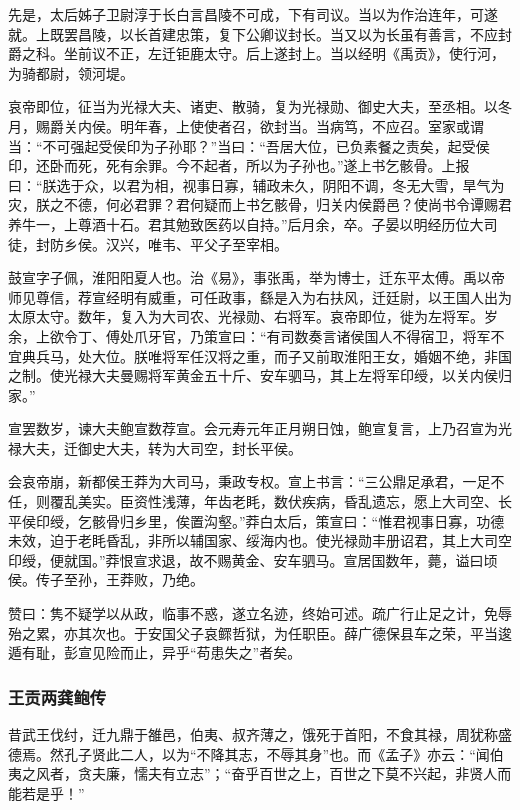 \documentclass[]{article}
\begin{document}
先是，太后姊子卫尉淳于长白言昌陵不可成，下有司议。当以为作治连年，可遂就。上既罢昌陵，以长首建忠策，复下公卿议封长。当又以为长虽有善言，不应封爵之科。坐前议不正，左迁钜鹿太守。后上遂封上。当以经明《禹贡》，使行河，为骑都尉，领河堤。

哀帝即位，征当为光禄大夫、诸吏、散骑，复为光禄勋、御史大夫，至丞相。以冬月，赐爵关内侯。明年春，上使使者召，欲封当。当病笃，不应召。室家或谓当：``不可强起受侯印为子孙耶？''当曰：``吾居大位，已负素餐之责矣，起受侯印，还卧而死，死有余罪。今不起者，所以为子孙也。''遂上书乞骸骨。上报曰：``朕选于众，以君为相，视事日寡，辅政未久，阴阳不调，冬无大雪，旱气为灾，朕之不德，何必君罪？君何疑而上书乞骸骨，归关内侯爵邑？使尚书令谭赐君养牛一，上尊酒十石。君其勉致医药以自持。''后月余，卒。子晏以明经历位大司徒，封防乡侯。汉兴，唯韦、平父子至宰相。

鼓宣字子佩，淮阳阳夏人也。治《易》，事张禹，举为博士，迁东平太傅。禹以帝师见尊信，荐宣经明有威重，可任政事，繇是入为右扶风，迁廷尉，以王国人出为太原太守。数年，复入为大司农、光禄勋、右将军。哀帝即位，徙为左将军。岁余，上欲令丁、傅处爪牙官，乃策宣曰：``有司数奏言诸侯国人不得宿卫，将军不宜典兵马，处大位。朕唯将军任汉将之重，而子又前取淮阳王女，婚姻不绝，非国之制。使光禄大夫曼赐将军黄金五十斤、安车驷马，其上左将军印绶，以关内侯归家。''

宣罢数岁，谏大夫鲍宣数荐宣。会元寿元年正月朔日蚀，鲍宣复言，上乃召宣为光禄大夫，迁御史大夫，转为大司空，封长平侯。

会哀帝崩，新都侯王莽为大司马，秉政专权。宣上书言：``三公鼎足承君，一足不任，则覆乱美实。臣资性浅薄，年齿老眊，数伏疾病，昏乱遗忘，愿上大司空、长平侯印绶，乞骸骨归乡里，俟置沟壑。''莽白太后，策宣曰：``惟君视事日寡，功德未效，迫于老眊昏乱，非所以辅国家、绥海内也。使光禄勋丰册诏君，其上大司空印绶，便就国。''莽恨宣求退，故不赐黄金、安车驷马。宣居国数年，薨，谥曰顷侯。传子至孙，王莽败，乃绝。

赞曰：隽不疑学以从政，临事不惑，遂立名迹，终始可述。疏广行止足之计，免辱殆之累，亦其次也。于安国父子哀鳏哲狱，为任职臣。薛广德保县车之荣，平当逡遁有耻，彭宣见险而止，异乎``苟患失之''者矣。

\hypertarget{header-n5208}{%
\subsubsection{王贡两龚鲍传}\label{header-n5208}}

昔武王伐纣，迁九鼎于雒邑，伯夷、叔齐薄之，饿死于首阳，不食其禄，周犹称盛德焉。然孔子贤此二人，以为``不降其志，不辱其身''也。而《孟子》亦云：``闻伯夷之风者，贪夫廉，懦夫有立志''；``奋乎百世之上，百世之下莫不兴起，非贤人而能若是乎！''
\end{document}
